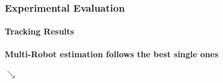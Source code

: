 \begin{frame}
	\frametitle{Experimental Evaluation}
	\framesubtitle{Tracking Results}
	
	\vspace{-1cm}
	
	\begin{figure}
		\centering
		
	\end{figure}
	
	\vspace{-4cm}
	
	\begin{tabbing}
		\scriptsize
		\hspace{3.83cm}
		
		\textbf{Multi-Robot estimation follows the best single ones}
	\end{tabbing}
	
	\vspace{-0.85cm}
	
	\begin{tabbing}
		\Huge
		\hspace{8cm}
		$ \searrow $
	\end{tabbing}
\end{frame}

